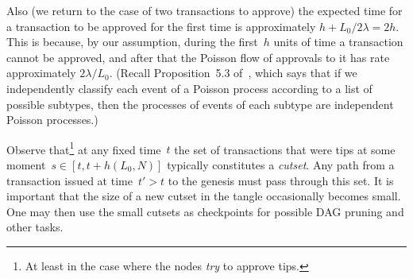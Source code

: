 \documentclass[12pt]{article}
\begin{document}
\begin{CJK}{UTF8}{bkai}
Also (we return to the case of two transactions to approve) 
the expected time for a transaction to be 
approved for the first time is approximately $h+L_0/2\lambda=2h$.
This is because, by our assumption, during the first~$h$
units of time a transaction cannot be approved, and after
that the Poisson flow
of approvals to it has rate approximately $2\lambda/L_0$. 
(Recall Proposition~5.3 of~\cite{Ross_m}, which says 
that if we independently classify each event of a Poisson process
according to a list of possible subtypes,
then the processes of events of each subtype 
are independent Poisson processes.)

Observe that\footnote{At least in the case where the nodes
\emph{try} to approve tips.} at any fixed time~$t$ the set 
of transactions that were tips
at some moment~$s\in[t,t+h(L_0,N)]$ typically
constitutes a \emph{cutset}. 
Any path from 
a transaction issued at time~$t'>t$ to the genesis must pass
through this set. It is important that the size of 
a new cutset in the tangle occasionally becomes small. 
One may then 
use the small cutsets as checkpoints for possible DAG pruning
and other tasks.



\end{CJK}
\end{document}
